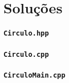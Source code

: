 \documentclass[aspectratio=169]{beamer}
\begin{document}
\section{Soluções}

\begin{frame}[fragile]\frametitle{\texttt{Circulo.hpp}}
\fontsize{6pt}{6pt}\selectfont{

}
\end{frame}

\begin{frame}[fragile]\frametitle{\texttt{Circulo.cpp}}
\fontsize{6pt}{6pt}\selectfont{

}
\end{frame}

\begin{frame}[fragile]\frametitle{\texttt{CirculoMain.cpp}}
\fontsize{6pt}{6pt}\selectfont{

}
\end{frame}

\end{document}

